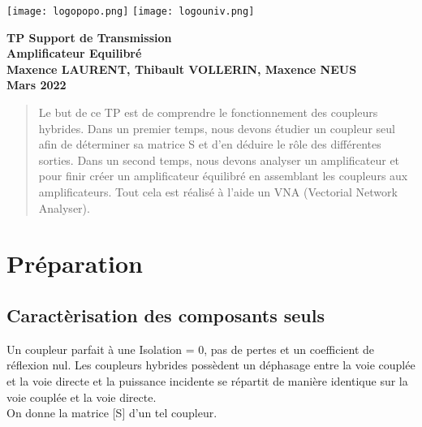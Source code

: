 \documentclass[oneside,a4paper,12pt]{article}
\begin{document}
	\begin{titlepage}
		\texttt{[image: logopopo.png]}
		\hspace*{\fill}
		\texttt{[image: logouniv.png]}
		
		\begin{center}
			\vspace{1cm}
			\textbf{TP Support de Transmission}\\
			\textbf{Amplificateur Equilibré}\\
			\vspace{1cm}
			\textbf{Maxence LAURENT, Thibault VOLLERIN, Maxence NEUS}\\
			\vspace{3cm}
			\vspace{\fill}
			\textbf{Mars 2022}\\
		\end{center}
	\end{titlepage}
	
	\tableofcontents
	
	\vspace{5cm}
	
	\begin{abstract}
	Le but de ce TP est de comprendre le fonctionnement des coupleurs hybrides. Dans un premier temps, 
	nous devons étudier un coupleur seul afin de déterminer sa matrice S et d’en déduire le rôle des différentes sorties. 
	Dans un second temps, nous devons analyser un amplificateur et pour finir créer un amplificateur équilibré en assemblant les coupleurs aux amplificateurs. 
	Tout cela est réalisé à l’aide un VNA (Vectorial Network Analyser).
 	\end{abstract}

	\newpage

	\section{Préparation}
	\subsection{Caractèrisation des composants seuls}
	Un coupleur parfait à une Isolation = 0, pas de pertes et un coefficient de réflexion nul.
	Les coupleurs hybrides possèdent un déphasage entre la voie couplée et la voie directe et 
	la puissance incidente se répartit de manière identique sur la voie couplée et la voie directe.\\
	On donne la matrice [S] d'un tel coupleur.
\end{document}
